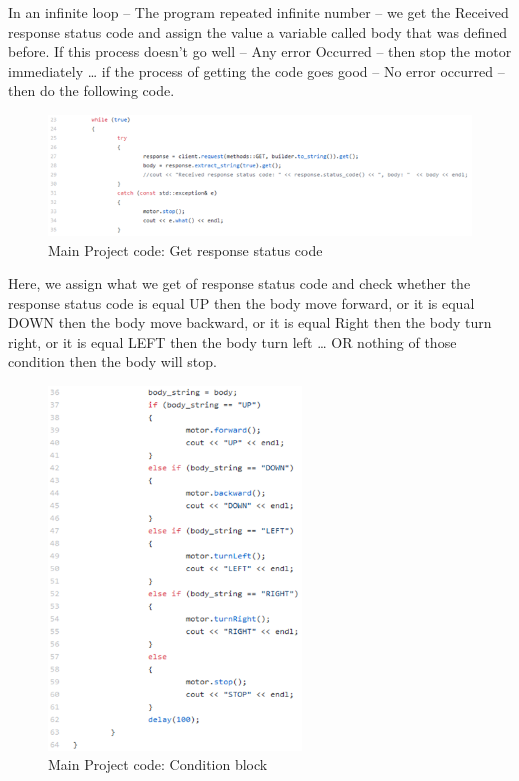 \newpage

In an infinite loop – The program repeated infinite number – we get the Received response status code and assign the value a variable called body that was defined before. If this process doesn’t go well – Any error Occurred – then stop the motor immediately … if the process of getting the code goes good – No error occurred – then do the following code. 

\begin{figure}[h]
    \centering
    \includegraphics{figures/69.png}
    \caption{Main Project code: Get response status code}
    \label{fig:my_label}
\end{figure}

\newpage

Here, we assign what we get of response status code and check whether the response status code is equal UP then the body move forward, or it is equal DOWN then the body move backward, or it is equal Right then the body turn right, or it is equal LEFT then the body turn left … OR nothing of those condition then the body will stop.

\begin{figure}[h]
    \centering
    \includegraphics[width=0.6\textwidth]{figures/70.png}
    \caption{Main Project code: Condition block}
    \label{fig:my_label}
\end{figure}
